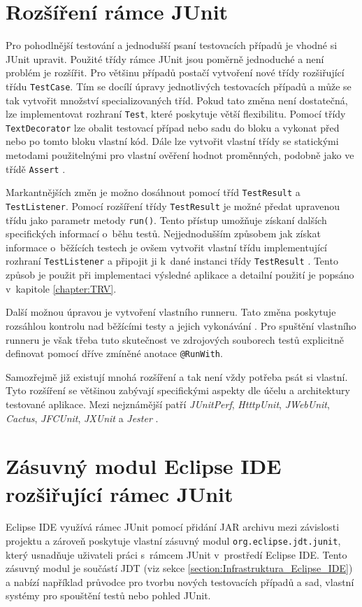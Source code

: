   \section{Rozšíření rámce JUnit}
  Pro pohodlnější testování a jednodušší psaní testovacích případů je vhodné si JUnit upravit. Použité třídy rámce JUnit jsou poměrně jednoduché a není problém je rozšířit. Pro většinu případů postačí vytvoření nové třídy rozšiřující třídu \texttt{TestCase}. Tím se docílí úpravy jednotlivých testovacích případů a může se tak vytvořit množství specializovaných tříd. Pokud tato změna není dostatečná, lze implementovat rozhraní \texttt{Test}, které poskytuje větší flexibilitu. Pomocí třídy \texttt{TextDecorator} lze obalit testovací případ nebo sadu do bloku a vykonat před nebo po tomto bloku vlastní kód. Dále lze vytvořit vlastní třídy se statickými metodami použitelnými pro vlastní ověření hodnot proměnných, podobně jako ve třídě \texttt{Assert} \cite{JUnitGuide}.

  Markantnějších změn je možno dosáhnout pomocí tříd \texttt{TestResult} a \texttt{TestListener}. Pomocí rozšíření třídy \texttt{TestResult} je možné předat upravenou třídu jako parametr metody \texttt{run()}. Tento přístup umožňuje získaní dalších specifických informací o~běhu testů. Nejjednodušším způsobem jak získat informace o~běžících testech je ovšem vytvořit vlastní třídu implementující rozhraní \texttt{TestListener} a připojit ji k~dané instanci třídy \texttt{TestResult} \cite{JUnitGuide}. Tento způsob je použit při implementaci výsledné aplikace a detailní použití je popsáno v~kapitole \ref{chapter:TRV}.

  Další možnou úpravou je vytvoření vlastního runneru. Tato změna poskytuje rozsáhlou kontrolu nad běžícími testy a jejich vykonávání \cite{JUnitGuide}. Pro spuštění vlastního runneru je však třeba tuto skutečnost ve zdrojových souborech testů explicitně definovat pomocí dříve zmíněné anotace \texttt{@RunWith}.

  Samozřejmě již existují mnohá rozšíření a tak není vždy potřeba psát si vlastní. Tyto rozšíření se většinou zabývají specifickými aspekty dle účelu a architektury testované aplikace. Mezi nejznámější patří \emph{JUnitPerf}, \emph{HtttpUnit}, \emph{JWebUnit}, \emph{Cactus}, \emph{JFCUnit}, \emph{JXUnit} a \emph{Jester} \cite{JUnitGuide}.

  \section{Zásuvný modul Eclipse IDE rozšiřující rámec JUnit}
  Eclipse IDE využívá rámec JUnit pomocí přidání JAR archivu mezi závislosti projektu a zároveň poskytuje vlastní zásuvný modul \texttt{org.eclipse.jdt.junit}, který usnadňuje uživateli práci s~rámcem JUnit v~prostředí Eclipse IDE. Tento zásuvný modul je součástí JDT (viz sekce \ref{section:Infrastruktura_Eclipse_IDE}) a nabízí například průvodce pro tvorbu nových testovacích případů a sad, vlastní systémy pro spouštění testů nebo pohled JUnit.

